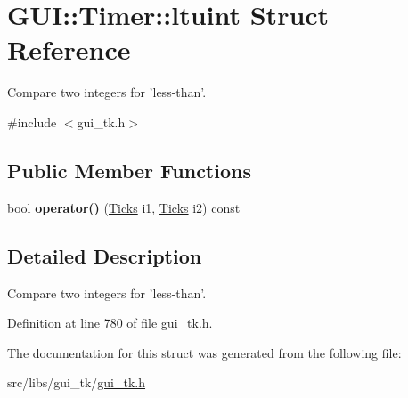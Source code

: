 \hypertarget{structGUI_1_1Timer_1_1ltuint}{\section{G\-U\-I\-:\-:Timer\-:\-:ltuint Struct Reference}
\label{structGUI_1_1Timer_1_1ltuint}
}


Compare two integers for 'less-\/than'.  




{\ttfamily \#include $<$gui\-\_\-tk.\-h$>$}

\subsection*{Public Member Functions}
\begin{DoxyCompactItemize}
\item 
\hypertarget{structGUI_1_1Timer_1_1ltuint_ac812e7336225709928959fdd35632405}{bool {\bfseries operator()} (\hyperlink{namespaceGUI_af396fee5d5c26b98218f5803f85e3b65}{Ticks} i1, \hyperlink{namespaceGUI_af396fee5d5c26b98218f5803f85e3b65}{Ticks} i2) const }\label{structGUI_1_1Timer_1_1ltuint_ac812e7336225709928959fdd35632405}

\end{DoxyCompactItemize}


\subsection{Detailed Description}
Compare two integers for 'less-\/than'. 

Definition at line 780 of file gui\-\_\-tk.\-h.



The documentation for this struct was generated from the following file\-:\begin{DoxyCompactItemize}
\item 
src/libs/gui\-\_\-tk/\hyperlink{gui__tk_8h}{gui\-\_\-tk.\-h}\end{DoxyCompactItemize}
